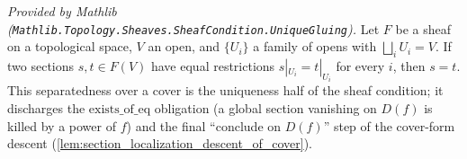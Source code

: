 \begin{lemma}
  \label{lem:eq_of_locally_eq_mathlib}
  \mathlibok
  \textit{Provided by Mathlib
  (\texttt{Mathlib.Topology.Sheaves.SheafCondition.UniqueGluing}).}
  Let \(F\) be a sheaf on a topological space, \(V\) an open, and \(\{U_i\}\) a family of opens with
  \(\bigsqcup_i U_i = V\). If two sections \(s, t \in F(V)\) have equal restrictions
  \(s|_{U_i} = t|_{U_i}\) for every \(i\), then \(s = t\). This separatedness over a cover is the
  uniqueness half of the sheaf condition; it discharges the \(\mathrm{exists\_of\_eq}\) obligation
  (a global section vanishing on \(D(f)\) is killed by a power of \(f\)) and the final
  ``conclude on \(D(f)\)'' step of the cover-form descent
  (\cref{lem:section_localization_descent_of_cover}).
\end{lemma}

